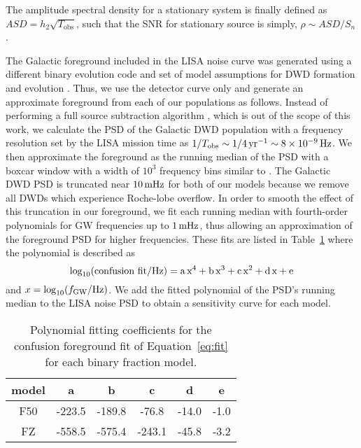 \documentclass[twocolumn]{aastex631}
\begin{document}
The amplitude spectral density for a stationary system is finally defined as $ASD = h_{2} \sqrt{T_\text{obs}}$, such that the SNR for stationary source is simply, $\rho \sim ASD/S_n$.

The Galactic foreground included in the \citet{Robson2019} LISA noise curve was generated using a different binary evolution code and set of model assumptions for DWD formation and evolution \citep{Toonen2012, Korol2017}. Thus, we use the detector curve only and generate an approximate foreground from each of our populations as follows. Instead of performing a full source subtraction algorithm \citep[e.g.][]{Littenberg2020}, which is out of the scope of this work, we calculate the PSD of the Galactic DWD population with a frequency resolution set by the LISA mission time as $1/T_{\rm{obs}}\sim1/4\,\rm{yr}^{-1}\sim8\times10^{-9}\,\rm{Hz}$. We then approximate the foreground as the running median of the PSD with a boxcar window with a width of $10^3$ frequency bins similar to \citet{Benacquista2006}. The Galactic DWD PSD is truncated near $10\,\rm{mHz}$ for both of our models because we remove all DWDs which experience Roche-lobe overflow. In order to smooth the effect of this truncation in our foreground, we fit each running median with fourth-order polynomials for GW frequencies up to $1\,\rm{mHz}$, thus allowing an approximation of the foreground PSD for higher frequencies. These fits are listed in Table~\ref{tbl:fits} where the polynomial is described as
\begin{equation}
\label{eq:fit}
    \log_{10}(\rm{confusion\ fit}/\rm{Hz}) = a\,x^4 + b\,x^3 + c\,x^2 + d\,x + e
\end{equation}
\noindent and $x=\log_{10}(f_{\rm{GW}}/\rm{Hz})$. We add the fitted polynomial of the PSD's running median to the LISA noise PSD to obtain a sensitivity curve for each model. 

\begin{table}[]
    \centering
    \begin{tabular}{|c|c|c|c|c|c|}
       \hline
       model & a & b & c & d & e \\
       \hline
       \hline
       F50 & -223.5 & -189.8 & -76.8 & -14.0 & -1.0 \\
       \hline
       FZ & -558.5 & -575.4 & -243.1 & -45.8 & -3.2 \\
       \hline
    \end{tabular}
    \caption{Polynomial fitting coefficients for the confusion foreground fit of Equation~\ref{eq:fit} for each binary fraction model.}
    \label{tbl:fits}
\end{table}
\end{document}
